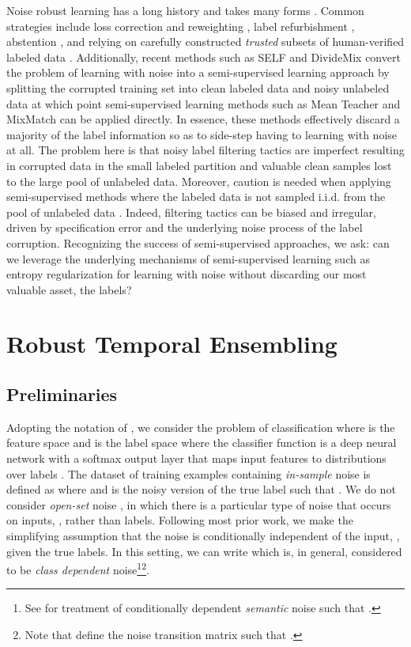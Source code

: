 \documentclass{article}
\begin{document}
Noise robust learning has a long history and takes many forms \cite{NIPS2013_5073,6685834,2020arXiv200708199S}.  Common strategies include loss correction and reweighting \cite{patrini2016,zhang2018,Menon2020Can}, label refurbishment \cite{reed2014,song2019}, abstention \cite{thulasidasan2019}, and relying on carefully constructed \emph{trusted} subsets of human-verified labeled data \cite{liiccv2017,NIPS2018_8246,zhang2020}.  Additionally, recent methods such as SELF \cite{nguyen2020} and DivideMix \cite{li2020} convert the problem of learning with noise into a semi-supervised learning approach by splitting the corrupted training set into clean labeled data and noisy unlabeled data at which point semi-supervised learning methods such as Mean Teacher \cite{tarvainen2017} and MixMatch \cite{48557} can be applied directly.  In essence, these methods effectively discard a majority of the label information so as to side-step having to learning with noise at all.  The problem here is that noisy label filtering tactics are imperfect resulting in corrupted data in the small labeled partition and valuable clean samples lost to the large pool of unlabeled data.  Moreover, caution is needed when applying semi-supervised methods where the labeled data is not sampled i.i.d. from the pool of unlabeled data \cite{NEURIPS2018_c1fea270}.  Indeed, filtering tactics can be biased and irregular, driven by specification error and the underlying noise process of the label corruption.  Recognizing the success of semi-supervised approaches, we ask: can we leverage the underlying mechanisms of semi-supervised learning such as entropy regularization for learning with noise without discarding our most valuable asset, the labels? 



\section{Robust Temporal Ensembling}
\subsection{Preliminaries}
\label{sec:prelim}
Adopting the notation of \cite{zhang2018}, we consider the problem of classification where  is the feature space and  is the label space where the classifier function is a deep neural network with a softmax output layer that maps input features to distributions over labels .  The dataset of training examples containing \emph{in-sample} noise is defined as  where  and  is the noisy version of the true label  such that .  We do not consider \emph{open-set} noise \cite{wang2018}, in which there is a particular type of noise that occurs on inputs, , rather than labels.  Following most prior work, we make the simplifying assumption that the noise is conditionally independent of the input, , given the true labels. In this setting, we can write  which is, in general, considered to be \emph{class dependent} noise\footnote{See \cite{lee2019} for treatment of conditionally dependent \emph{semantic} noise such that .}\footnote{Note that \cite{patrini2016} define the noise transition matrix  such that .}.
\end{document}
